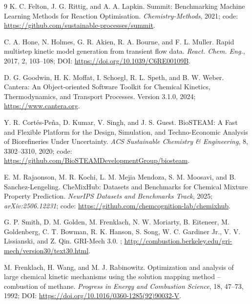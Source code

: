 \documentclass[11pt]{article}
\begin{document}
\begin{thebibliography}{9}
K. C. Felton, J. G. Rittig, and A. A. Lapkin.
\newblock Summit: Benchmarking Machine Learning Methods for Reaction Optimisation.
\newblock \emph{Chemistry-Methods}, 2021; code: \url{https://github.com/sustainable-processes/summit}.

C. A. Hone, N. Holmes, G. R. Akien, R. A. Bourne, and F. L. Muller.
\newblock Rapid multistep kinetic model generation from transient flow data.
\newblock \emph{React. Chem. Eng.}, 2017, 2, 103--108; DOI: \url{https://doi.org/10.1039/C6RE00109B}.

D. G. Goodwin, H. K. Moffat, I. Schoegl, R. L. Speth, and B. W. Weber.
\newblock Cantera: An Object-oriented Software Toolkit for Chemical Kinetics, Thermodynamics, and Transport Processes.
\newblock Version 3.1.0, 2024; \url{https://www.cantera.org}.

Y. R. Cort\'es-Pe\~na, D. Kumar, V. Singh, and J. S. Guest.
\newblock BioSTEAM: A Fast and Flexible Platform for the Design, Simulation, and Techno-Economic Analysis of Biorefineries Under Uncertainty.
\newblock \emph{ACS Sustainable Chemistry \& Engineering}, 8, 3302--3310, 2020; code: \url{https://github.com/BioSTEAMDevelopmentGroup/biosteam}.

E. M. Rajaonson, M. R. Kochi, L. M. Mejia Mendoza, S. M. Moosavi, and B. Sanchez-Lengeling.
\newblock CheMixHub: Datasets and Benchmarks for Chemical Mixture Property Prediction.
\newblock \emph{NeurIPS Datasets and Benchmarks Track}, 2025; \emph{arXiv:2506.12231}; code: \url{https://github.com/chemcognition-lab/chemixhub}.

G. P. Smith, D. M. Golden, M. Frenklach, N. W. Moriarty, B. Eiteneer, M. Goldenberg, C. T. Bowman, R. K. Hanson, S. Song, W. C. Gardiner Jr., V. V. Lissianski, and Z. Qin.
\newblock GRI-Mech 3.0.
; \url{http://combustion.berkeley.edu/gri-mech/version30/text30.html}.

M. Frenklach, H. Wang, and M. J. Rabinowitz.
\newblock Optimization and analysis of large chemical kinetic mechanisms using the solution mapping method -- combustion of methane.
\newblock \emph{Progress in Energy and Combustion Science}, 18, 47--73, 1992; DOI: \url{https://doi.org/10.1016/0360-1285(92)90032-V}.


\end{thebibliography}
\end{document}
